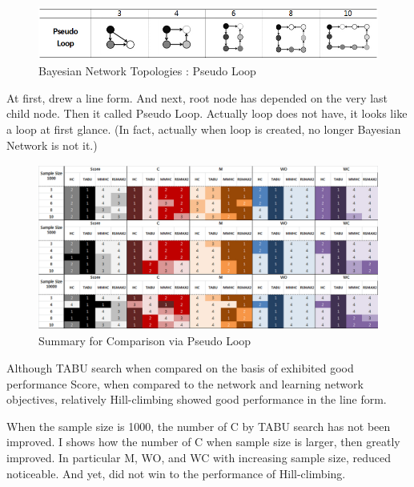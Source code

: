 	\begin{figure}[h]
	\centering
		\includegraphics[height=50pt]{Topologies_PseudoLoop}
		\caption{Bayesian Network Topologies : Pseudo Loop}
	\end{figure}	

	At first, drew a line form. And next, root node has depended on the very last child node. Then it called Pseudo Loop. Actually loop does not have, it looks like a loop at first glance. (In fact, actually when loop is created, no longer Bayesian Network is not it.)

\begin{figure}[!bhp]
	\centering
		\includegraphics[height=155pt]{Result_PseudoLoop}
		\caption{Summary for Comparison via Pseudo Loop}
	\end{figure}	

Although TABU search when compared on the basis of exhibited good performance Score, when compared to the network and learning network objectives, relatively Hill-climbing showed good performance in the line form.

When the sample size is 1000, the number of C by TABU search has not been improved. I shows how the number of C when sample size is larger, then greatly improved. In particular M, WO, and WC with increasing sample size, reduced noticeable. And yet, did not win to the performance of Hill-climbing.

